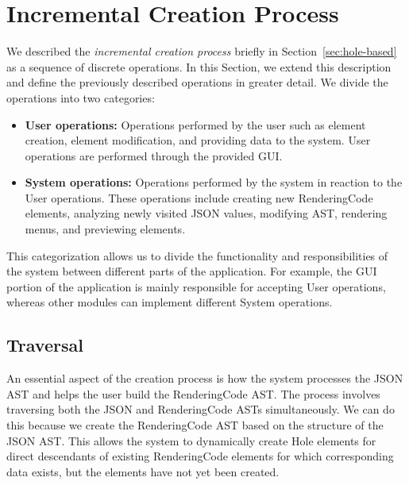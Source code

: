 \section{Incremental Creation Process}

We described the \emph{incremental creation process} briefly in Section~\ref{sec:hole-based} as a sequence of discrete operations.
In this Section, we extend this description and define the previously described operations in greater detail.
We divide the operations into two categories:
\begin{itemize}
	\item \textbf{User operations:} Operations performed by the user such as element creation, element modification, and providing data to the system.
	      User operations are performed through the provided GUI.
	\item \textbf{System operations:} Operations performed by the system in reaction to the User operations.
	      These operations include creating new RenderingCode elements, analyzing newly visited JSON values, modifying AST, rendering menus, and previewing elements.
\end{itemize}
This categorization allows us to divide the functionality and responsibilities of the system between different parts of the application.
For example, the GUI portion of the application is mainly responsible for accepting User operations, whereas other modules can implement different System operations.


\subsection{Traversal}
\label{sec:traversal}
An essential aspect of the creation process is how the system processes the JSON AST and helps the user build the RenderingCode AST.
The process involves traversing both the JSON and RenderingCode ASTs simultaneously.
We can do this because we create the RenderingCode AST based on the structure of the JSON AST.
This allows the system to dynamically create Hole elements for direct descendants of existing RenderingCode elements for which corresponding data exists, but the elements have not yet been created.

